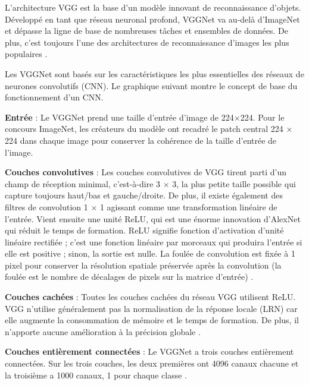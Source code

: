 	
	
	L'architecture VGG est  la base d'un modèle innovant de reconnaissance d'objets. Développé en tant que réseau neuronal profond, VGGNet va au-delà d'ImageNet et dépasse la ligne de base  de nombreuses tâches et ensembles de données. De plus, c'est toujours l'une des architectures de reconnaissance d'images les plus populaires \cite{tammina2019transfer, antoine2018apprentissage}.
	
	Les VGGNet sont basés sur les caractéristiques les plus essentielles des réseaux de neurones convolutifs (CNN). Le graphique suivant montre le concept de base du fonctionnement d'un CNN.
	
	
	\begin{list}{--}{Un bref coup d'œil à l'architecture de VGG :}
		\item \textbf{Entrée} : Le VGGNet prend une taille d'entrée d'image de 224×224. Pour le concours ImageNet, les créateurs du modèle ont recadré le patch central 224 × 224 dans chaque image pour conserver la cohérence de la taille d'entrée de l'image\cite{simonyan2014very}.
		
		\item \textbf{Couches convolutives }: Les couches convolutives de VGG tirent parti d'un champ de réception minimal, c'est-à-dire 3 × 3, la plus petite taille possible qui capture toujours haut/bas et gauche/droite. De plus, il existe également des filtres de convolution 1 × 1 agissant comme une transformation linéaire de l'entrée. Vient ensuite une unité ReLU, qui est une énorme innovation d'AlexNet qui réduit le temps de formation. ReLU signifie fonction d'activation d'unité linéaire rectifiée ; c'est une fonction linéaire par morceaux qui produira l'entrée si elle est positive ; sinon, la sortie est nulle. La foulée de convolution est fixée à 1 pixel pour conserver la résolution spatiale préservée après la convolution (la foulée est le nombre de décalages de pixels sur la matrice d'entrée)   \cite{tammina2019transfer}.
		
		\item \textbf{Couches cachées} : Toutes les couches cachées du réseau VGG utilisent ReLU. VGG n'utilise généralement pas la normalisation de la réponse locale (LRN) car elle augmente la consommation de mémoire et le temps de formation. De plus, il n'apporte aucune amélioration à la précision globale \cite{tammina2019transfer}.
		
		\item \textbf{Couches entièrement connectées} : Le VGGNet a trois couches entièrement connectées. Sur les trois couches, les deux premières ont 4096 canaux chacune et la troisième a 1000 canaux, 1 pour chaque classe \cite{tammina2019transfer}.
	
	\end{list}
	

